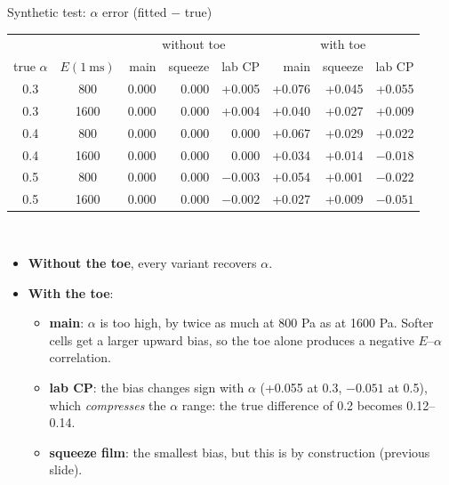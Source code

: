 \documentclass[aspectratio=169,9pt]{beamer}
\begin{document}
\begin{frame}{Synthetic test: $\alpha$ error (fitted $-$ true)}
\small
\centering
\begin{tabular}{@{}cc|rrr|rrr@{}}
\toprule
 & & \multicolumn{3}{c|}{without toe} & \multicolumn{3}{c}{with toe}\\
true $\alpha$ & $E(\SI{1}{\milli\second})$ & main & squeeze & lab CP & \textcolor{cRed}{main} & \textcolor{cBlue}{squeeze} & \textcolor{cGreen}{lab CP}\\
\midrule
0.3 & 800 & 0.000 & 0.000 & +0.005 & +0.076 & +0.045 & +0.055\\
0.3 & 1600 & 0.000 & 0.000 & +0.004 & +0.040 & +0.027 & +0.009\\
0.4 & 800 & 0.000 & 0.000 & 0.000 & +0.067 & +0.029 & +0.022\\
0.4 & 1600 & 0.000 & 0.000 & 0.000 & +0.034 & +0.014 & $-0.018$\\
0.5 & 800 & 0.000 & 0.000 & $-0.003$ & +0.054 & +0.001 & $-0.022$\\
0.5 & 1600 & 0.000 & 0.000 & $-0.002$ & +0.027 & +0.009 & $-0.051$\\
\bottomrule
\end{tabular}\\[8pt]
\raggedright
\begin{itemize}
\item \textbf{Without the toe}, every variant recovers $\alpha$.
\item \textbf{With the toe}:
 \begin{itemize}
 \item \textbf{main}: $\alpha$ is too high, by twice as much at 800 Pa as at 1600 Pa. Softer cells get a larger upward bias, so the toe alone produces a negative $E$--$\alpha$ correlation.
 \item \textbf{lab CP}: the bias changes sign with $\alpha$ (+0.055 at 0.3, $-0.051$ at 0.5), which \emph{compresses} the $\alpha$ range: the true difference of 0.2 becomes 0.12--0.14.
 \item \textbf{squeeze film}: the smallest bias, but this is by construction (previous slide).
 \end{itemize}
\end{itemize}
\end{frame}
\end{document}
